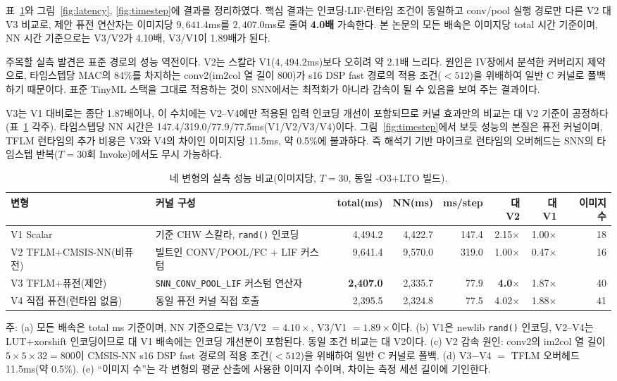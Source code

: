 표~\ref{tab:perf}와 그림~\ref{fig:latency}, \ref{fig:timestep}에
결과를 정리하였다. 핵심 결과는 인코딩$\cdot$LIF$\cdot$런타임 조건이
동일하고 conv/pool 실행 경로만 다른 V2 대 V3 비교로, 제안 퓨전 연산자는
이미지당 $9{,}641.4$ms를 $2{,}407.0$ms로 줄여 \textbf{4.0배}
가속한다. 본 논문의 모든 배속은 이미지당 total 시간 기준이며, NN 시간
기준으로는 V3/V2가 4.10배, V3/V1이 1.89배가 된다.

주목할 실측 발견은 표준 경로의 성능 역전이다. V2는 스칼라
V1($4{,}494.2$ms)보다 오히려 약 2.1배 느리다. 원인은 IV장에서 분석한
커버리지 제약으로, 타임스텝당 MAC의 84\%를 차지하는 conv2(im2col 열
길이 800)가 s16 DSP fast 경로의 적용 조건($<512$)을 위배하여 일반 C
커널로 폴백하기 때문이다. 표준 TinyML 스택을 그대로 적용하는 것이 SNN에서는
최적화가 아니라 감속이 될 수 있음을 보여 주는 결과이다.

V3는 V1 대비로는 종단 1.87배이나, 이 수치에는 V2--V4에만 적용된 입력
인코딩 개선이 포함되므로 커널 효과만의 비교는 대 V2 기준이
공정하다(표~\ref{tab:perf} 각주). 타임스텝당 NN 시간은
147.4/319.0/77.9/77.5ms(V1/V2/V3/V4)이다. 그림~\ref{fig:timestep}에서
보듯 성능의 본질은 퓨전 커널이며, TFLM 런타임의 추가 비용은 V3와 V4의
차이인 이미지당 11.5ms, 약 0.5\%에 불과하다. 즉 해석기 기반 마이크로
런타임의 오버헤드는 SNN의 타임스텝 반복($T=30$회 Invoke)에서도 무시
가능하다.

\begin{table}[t]
\centering
\caption{네 변형의 실측 성능 비교(이미지당, $T=30$, 동일 -O3+LTO 빌드).}
\label{tab:perf}
\footnotesize
\setlength{\tabcolsep}{4.5pt}
\begin{tabular}{l l r r r r r r}
\hline
변형 & 커널 구성 & total(ms) & NN(ms) & ms/step & 대 V2 & 대 V1 & 이미지 수 \\
\hline
V1 Scalar & 기준 CHW 스칼라, \texttt{rand()} 인코딩 & 4,494.2 & 4,422.7 & 147.4 & 2.15$\times$ & 1.00$\times$ & 18 \\
V2 TFLM+CMSIS-NN(비퓨전) & 빌트인 CONV/POOL/FC + LIF 커스텀 & 9,641.4 & 9,570.0 & 319.0 & 1.00$\times$ & 0.47$\times$ & 16 \\
V3 TFLM+퓨전(제안) & \texttt{SNN\_CONV\_POOL\_LIF} 커스텀 연산자 & \textbf{2,407.0} & 2,335.7 & 77.9 & \textbf{4.0$\times$} & 1.87$\times$ & 40 \\
V4 직접 퓨전(런타임 없음) & 동일 퓨전 커널 직접 호출 & 2,395.5 & 2,324.8 & 77.5 & 4.02$\times$ & 1.88$\times$ & 41 \\
\hline
\end{tabular}
\begin{flushleft}
\footnotesize 주: (a) 모든 배속은 total ms 기준이며, NN 기준으로는
V3/V2 $=4.10\times$, V3/V1 $=1.89\times$이다. (b) V1은 newlib
\texttt{rand()} 인코딩, V2--V4는 LUT+xorshift 인코딩이므로 대 V1
배속에는 인코딩 개선분이 포함된다. 동일 조건 비교는 대 V2이다. (c) V2
감속 원인: conv2의 im2col 열 길이 $5\times5\times32=800$이 CMSIS-NN
s16 DSP fast 경로의 적용 조건($<512$)을 위배하여 일반 C 커널로 폴백.
(d) V3$-$V4 $=$ TFLM 오버헤드 11.5ms(약 0.5\%). (e) ``이미지 수''는 각
변형의 평균 산출에 사용한 이미지 수이며, 차이는 측정 세션 길이에
기인한다.
\end{flushleft}
\end{table}

